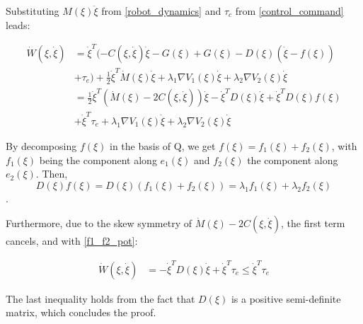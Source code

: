 Substituting $M(\xi)\ddot\xi$ from \eqref{robot_dynamics} and $\tau_c$ from \eqref{control_command} leads:

\begin{equation}
\begin{aligned}
    \dot W(\xi, \dot\xi) 
    & = \dot\xi^T (-C(\xi,\dot\xi)\dot\xi - G(\xi) + G(\xi) - D(\xi)(\dot\xi - f(\xi))\\
    & + \tau_e) + \frac{1}{2}\dot\xi^T \dot M(\xi)\dot\xi + \lambda_1 \nabla V_1(\xi) \dot\xi + \lambda_2 \nabla V_2(\xi) \dot\xi \\
    & = \frac{1}{2}\dot\xi^T(\dot M(\xi) - 2C(\xi,\dot\xi))\dot\xi - \dot\xi^T D(\xi)\dot\xi + \dot\xi^T D(\xi) f(\xi)\\
    & + \dot\xi^T \tau_e + \lambda_1 \nabla V_1(\xi) \dot\xi + \lambda_2 \nabla V_2(\xi) \dot\xi
\end{aligned}
\end{equation}

By decomposing $f(\xi)$ in the basis of Q, we get $f(\xi) = f_1(\xi) + f_2(\xi)$, with $f_1(\xi)$ being the component along $e_1(\xi)$ and $f_2(\xi)$ the component along $e_2(\xi)$. Then,  $$D(\xi) f(\xi) = D(\xi) (f_1(\xi) + f_2(\xi)) =\lambda_1 f_1(\xi) + \lambda_2 f_2(\xi)$$. 

Furthermore, due to the skew symmetry of $\dot M(\xi) - 2C(\xi,\dot\xi)$, the first term cancels, and with \eqref{f1_f2_pot}: 

\begin{equation}
\begin{aligned}
    \dot W(\xi, \dot\xi) 
    & = - \dot\xi^T D(\xi)\dot\xi + \dot\xi^T \tau_e \leq \dot\xi^T \tau_e
\end{aligned}
\end{equation}

The last inequality holds from the fact that $D(\xi)$ is a positive semi-definite matrix, which concludes the proof.


